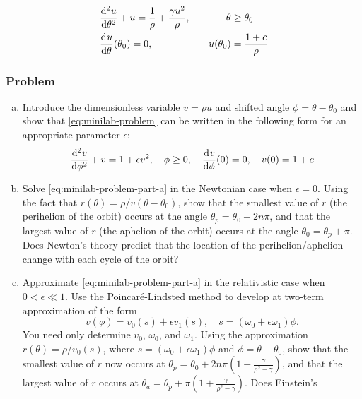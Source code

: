 \documentclass[12pt]{article}
\begin{document}
\begin{equation}
  \label{eq:minilab-problem}
  \begin{aligned}
    &\od[2]{u}{\theta} + u = \frac{1}{\rho} + \frac{\gamma u^2}{\rho},&\quad
    \theta&\ge\theta_0 \\
    &\od{u}{\theta}(\theta_0) = 0, &\quad u(\theta_0)&=\frac{1+c}{\rho} \\
  \end{aligned}
\end{equation}

\subsubsection*{Problem}
\begin{enumerate}[(a)]
\item Introduce the dimensionless variable $v=\rho u$ and shifted angle
  $\phi=\theta-\theta_0$ and show that \cref{eq:minilab-problem} can be written
  in the following form for an appropriate parameter $\epsilon$:
  \begin{equation}
    \label{eq:minilab-problem-part-a}
    \od[2]{v}{\phi} + v = 1 + \epsilon v^2,\quad \phi\ge0,\quad
    \od{v}{\phi}(0)=0,\quad v(0)=1+c
  \end{equation}
\item\label{itm:minilab-b} Solve \cref{eq:minilab-problem-part-a} in the
  Newtonian case when $\epsilon=0$. Using the fact that
  $r(\theta)=\rho/v(\theta-\theta_0)$, show that the smallest value of $r$ (the
  perihelion of the orbit) occurs at the angle $\theta_p=\theta_0+2n\pi$, and
  that the largest value of $r$ (the aphelion of the orbit) occurs at the angle
  $\theta_0=\theta_p+\pi$. Does Newton's theory predict that the location of the
  perihelion/aphelion change with each cycle of the orbit?
\item\label{itm:minilab-c} Approximate \cref{eq:minilab-problem-part-a} in the
  relativistic case when $0<\epsilon\ll1$. Use the Poincar\'{e}-Lindsted method
  to develop at two-term approximation of the form
  $$v(\phi)=v_0(s)+\epsilon v_1(s),\quad s=(\omega_0+\epsilon\omega_1)\phi.$$
  You need only determine $v_0$, $\omega_0$, and $\omega_1$. Using the
  approximation $r(\theta)=\rho/v_0(s)$, where
  $s=(\omega_0+\epsilon\omega_1)\phi$ and $\phi=\theta-\theta_0$, show that the
  smallest value of $r$ now occurs at
  $\theta_p=\theta_0+2n\pi(1+\frac{\gamma}{\rho^2-\gamma})$, and that the
  largest value of $r$ occurs at
  $\theta_a=\theta_p+\pi(1+\frac{\gamma}{\rho^2-\gamma})$. Does Einstein's

\end{enumerate}
\end{document}
